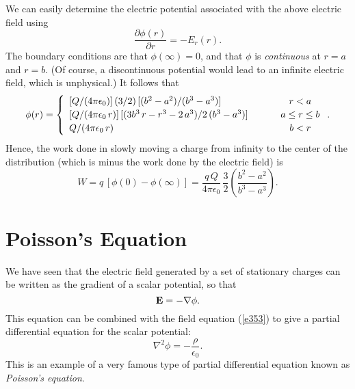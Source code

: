 We can  easily determine the electric potential associated with the above 
electric field using
\begin{equation}
\frac{\partial\phi(r)}{\partial r} = -E_r(r).
\end{equation}
The boundary conditions are that $\phi(\infty)=0$, and that $\phi$ is
{\em continuous}\/ at $r=a$ and $r=b$. (Of course, a discontinuous potential would lead to
an infinite electric field, which is unphysical.) It follows that
\begin{equation}
\phi(r) = \left\{ 
\begin{array}{lcc}
[Q/(4\pi\epsilon_0)]\,(3/2)\,[(b^2-a^2)/(b^3-a^3)]&\mbox{\hspace{0.5cm}}&r<a\\[0.5ex]
[Q/(4\pi\epsilon_0\,r)]\,[(3b^3\,r-r^3-2\,a^3)/2\,(b^3-a^3)]&&a\leq r\leq b\\[0.5ex]
Q/(4\pi\epsilon_0\,r)&&b<r
\end{array}
\right..
\end{equation}
Hence, the work done in slowly moving a charge from infinity to the
center of the distribution (which is minus the work done by the electric field)
is
\begin{equation}
W = q\,\left[\phi(0)-\phi(\infty)\right] = \frac{q\,Q}{4\pi\epsilon_0}\,\frac{3}{2}\left(\frac{b^2-a^2}{b^3-a^3}\right).
\end{equation}

\section{Poisson's Equation}
We have seen that the electric field generated by a set of stationary charges can be written as
the gradient of a scalar potential, so  that
\begin{equation}
{\bf E} = - \nabla \phi.
\end{equation}
This equation can be combined with the field equation (\ref{e353}) to give a partial
differential equation for the scalar potential:
\begin{equation}\label{e359}
\nabla^2 \phi = -\frac{\rho}{\epsilon_0}.
\end{equation}
This is an example of a very famous type of partial differential equation known
as {\em Poisson's equation}.

